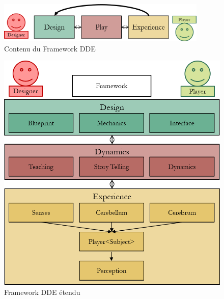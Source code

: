 \begin{figure}[H]
    \centering
    \includegraphics[width=10cm]{10_img/chap3/dpe.png} 
    \caption{Contenu du Framework DDE \cite{DDE}}
\end{figure}

\begin{figure}[H]
    \centering
    \includegraphics[width=14cm]{10_img/chap3/dde_extended_modif.png} 
    \caption{Framework DDE étendu \cite{DDE}}
\end{figure}
